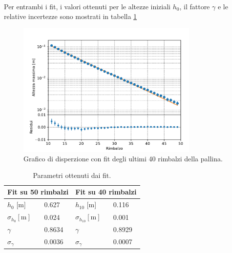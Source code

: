 \documentclass[a4paper]{article}
\begin{document}
    Per entrambi i fit, i valori ottenuti per le altezze iniziali $h_0$,
    il fattore $\gamma$ e le relative incertezze sono mostrati in tabella \ref{tab:fit}
    \begin{figure}[ht!]
        \centering
        \includegraphics[width=0.8\textwidth]{extra/altezza_rimbalzi[10:].pdf}
        \caption{Grafico di disperzione con fit degli ultimi 40 rimbalzi della pallina.}
        \label{fig:altezze_2}
    \end{figure}
    \begin{table}[ht!]
        \centering
        \begin{tabular}{ll|ll}
            \multicolumn{2}{c|}{Fit su 50 rimbalzi} & \multicolumn{2}{c}{Fit su 40 rimbalzi} \\
            \hline
            \hline
            $h_0$ [\si{\m}] & 0.627 & $h_{10}$ [\si{\m}] & 0.116\\
            $\sigma_{h_0} [\si{\m}]$ & 0.024 & $\sigma_{h_{10}} [\si{\m}]$ & 0.001\\
            $\gamma$ & 0.8634 & $\gamma$ & 0.8929\\
            $\sigma_{\gamma}$ & 0.0036 & $\sigma_{\gamma}$ & 0.0007
        \end{tabular}
        \caption{Parametri ottenuti dai fit.}
        \label{tab:fit}
    \end{table}
\end{document}
